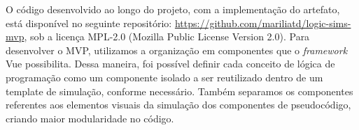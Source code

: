 O código desenvolvido ao longo do projeto, com a implementação do artefato, está disponível no seguinte repositório: \url{https://github.com/mariliatd/logic-sims-mvp}, sob a licença MPL-2.0 (Mozilla Public License Version 2.0). Para desenvolver o MVP, utilizamos a organização em componentes que o \textit{framework} Vue possibilita. Dessa maneira, foi possível definir cada conceito de lógica de programação como um componente isolado a ser reutilizado dentro de um template de simulação, conforme necessário. Também separamos os componentes referentes aos elementos visuais da simulação dos componentes de pseudocódigo, criando maior modularidade no código.





